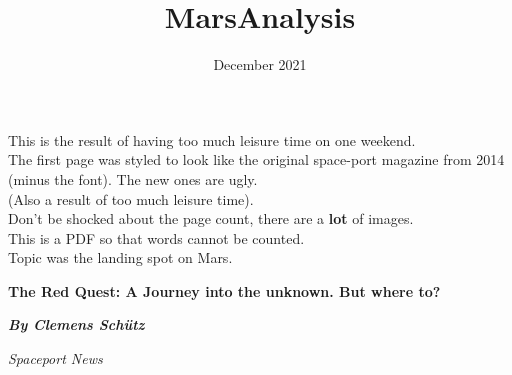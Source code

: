 \documentclass{article}
\title{MarsAnalysis}
\date{December 2021}
\begin{document}
{
    \noindent
    \begin{center}
        \vspace*{\fill}
        This is the result of having too much leisure time on one weekend.\\
        The first page was styled to look like the original space-port magazine from 2014 (minus the font). The new ones are ugly. \\
        (Also a result of too much leisure time).\\
        Don't be shocked about the page count, there are a \textbf{lot} of images.\\
        This is a PDF so that words cannot be counted. \\
        Topic was the landing spot on Mars.
        \vspace*{\fill}
    \end{center}
}
\pagebreak


\noindent
{\fontsize{40pt}{42pt}
    \selectfont \noindent \textbf{The Red Quest: A Journey into the unknown. But where to?}
}

\vspace{\baselineskip} %

\noindent %
\textbf{\emph{By Clemens Schütz}} %

\noindent %
\emph{Spaceport News}
\end{document}
